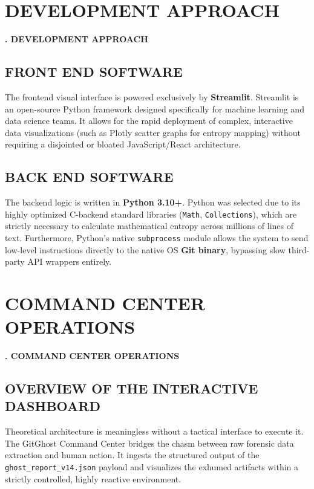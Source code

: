\documentclass[12pt, a4paper, oneside]{report}
\begin{document}
\chapter{DEVELOPMENT APPROACH}
\begin{center}
    {\Large \textbf{\thechapter. DEVELOPMENT APPROACH} \par}
\end{center}
\vspace{1cm}

\section{FRONT END SOFTWARE}
The frontend visual interface is powered exclusively by \textbf{Streamlit}. Streamlit is an open-source Python framework designed specifically for machine learning and data science teams. It allows for the rapid deployment of complex, interactive data visualizations (such as Plotly scatter graphs for entropy mapping) without requiring a disjointed or bloated JavaScript/React architecture.

\section{BACK END SOFTWARE}
The backend logic is written in \textbf{Python 3.10+}. Python was selected due to its highly optimized C-backend standard libraries (\texttt{Math}, \texttt{Collections}), which are strictly necessary to calculate mathematical entropy across millions of lines of text. Furthermore, Python's native \texttt{subprocess} module allows the system to send low-level instructions directly to the native OS \textbf{Git binary}, bypassing slow third-party API wrappers entirely.

\chapter{COMMAND CENTER OPERATIONS}
\begin{center}
    {\Large \textbf{\thechapter. COMMAND CENTER OPERATIONS} \par}
\end{center}
\vspace{1cm}

\section{OVERVIEW OF THE INTERACTIVE DASHBOARD}
Theoretical architecture is meaningless without a tactical interface to execute it. The GitGhost Command Center bridges the chasm between raw forensic data extraction and human action. It ingests the structured output of the \texttt{ghost\_report\_v14.json} payload and visualizes the exhumed artifacts within a strictly controlled, highly reactive environment. 
\end{document}
